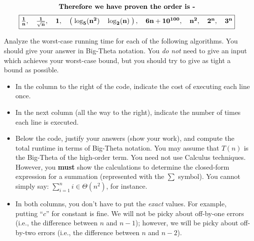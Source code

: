 \documentclass[9pt]{article}
\newcommand{\lp}{\left(}
\newcommand{\rp}{\right)}
\begin{document}
$$\text{\textbf{Therefore we have proven the order is -}} $$
\begin{align}
\boxed{$$\mathbf{\frac{1}{n},\quad \frac{1}{\sqrt n} ,\quad 1,\quad \lp\; \log_5 (n^2)\quad \log_2 (n) \;\rp,\quad 6n+10^{100},\quad n^2,\quad 2^n, \quad 3^n}$$} \nonumber
\end{align}
\fi
\newpage



\vspace{5mm}

\item 
Analyze the worst-case running time for each of the following algorithms. You should give your answer in Big-Theta notation. You \emph{do not} need to give an input which achieves your worst-case bound, but you should try to give as tight a bound as possible. 
	\begin{itemize}
	\item In the column to the right of the code, indicate the cost of executing each line once.
	
	\item In the next column (all the way to the right), indicate the number of times each line is executed.
	
	\item Below the code, justify your answers (show your work), and compute the total runtime in terms of Big-Theta notation.  You may assume that $T(n)$ is the Big-Theta of the high-order term. You need not use Calculus techniques. However, you \textbf{must} show the calculations to determine the closed-form expression for a summation (represented with the $\displaystyle \sum$ symbol). You cannot simply say: $\displaystyle \sum_{i=1}^{n} i \in \Theta(n^{2})$, for instance.
	
	\item In both columns, you don't have to put the \emph{exact} values. For example, putting ``$c$'' for constant is fine. We will not be picky about off-by-one errors (i.e., the difference between $n$ and $n-1$); however, we will be picky about off-by-two errors (i.e., the difference between $n$ and $n-2$).
    \end{itemize}
\end{document}
